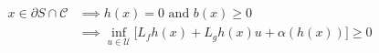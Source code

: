 \documentclass[preview]{standalone}
\begin{document}
\begin{align*}
x \in \partial S \cap \mathcal{C} &\implies h(x) = 0 \text{ and } b(x) \geq 0\\ &\implies \inf_{u \in \mathcal{U}} \big [ L_fh(x) + L_gh(x) u + \alpha(h(x)) \big] \geq 0\\
\end{align*}
\end{document}
